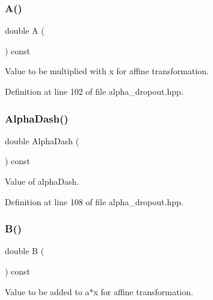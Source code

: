 \subsubsection{A()}
{\footnotesize\ttfamily double A (\begin{DoxyParamCaption}{ }\end{DoxyParamCaption}) const\hspace{0.3cm}{\ttfamily [inline]}}



Value to be multiplied with x for affine transformation. 



Definition at line 102 of file alpha\+\_\+dropout.\+hpp.

\mbox{\label{classmlpack_1_1ann_1_1AlphaDropout_a32c95c63853c50d490c6ce28c8032630}} 
\subsubsection{Alpha\+Dash()}
{\footnotesize\ttfamily double Alpha\+Dash (\begin{DoxyParamCaption}{ }\end{DoxyParamCaption}) const\hspace{0.3cm}{\ttfamily [inline]}}



Value of alpha\+Dash. 



Definition at line 108 of file alpha\+\_\+dropout.\+hpp.

\mbox{\label{classmlpack_1_1ann_1_1AlphaDropout_ab6ee6f0f970c90d4a148a64c074f09f5}} 
\subsubsection{B()}
{\footnotesize\ttfamily double B (\begin{DoxyParamCaption}{ }\end{DoxyParamCaption}) const\hspace{0.3cm}{\ttfamily [inline]}}



Value to be added to a$\ast$x for affine transformation. 



